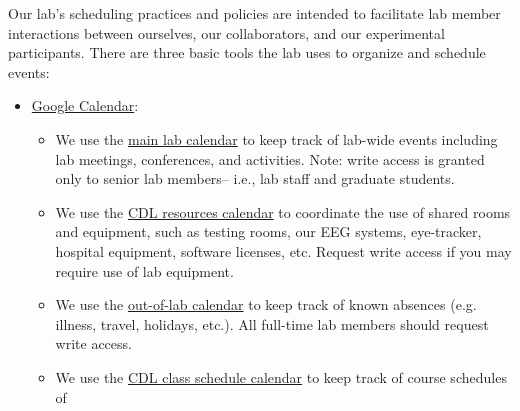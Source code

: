 \documentclass{tufte-book} %
\begin{document}
\label{sec: scheduling}

\noindent{}Our lab's scheduling practices and
policies are intended to facilitate lab member interactions between
ourselves, our collaborators, and our experimental participants.
There are three basic tools the lab uses to organize and schedule
events:
\begin{itemize}
\item \href{http://calendar.google.com}{Google Calendar}:
  \begin{itemize}
  \item We use the
    \href{https://calendar.google.com/calendar/ical/5ta50cfv4uih0a0k8m2di9dhjo\%40group.calendar.google.com/private-ff1338ddce84ac37d5ab682cd94e7f69/basic.ics}{main
      lab calendar} to keep track of lab-wide events including lab
    meetings, conferences, and activities.  Note: write access is
    granted only to senior lab members-- i.e., lab staff and graduate students.
  \item We use the
    \href{https://calendar.google.com/calendar/ical/dgcv8l8a8s10hfg2s5h0qec0q0\%40group.calendar.google.com/private-4810aed94f818d5748045447ab46c62d/basic.ics}{CDL
      resources calendar} to coordinate the use of shared rooms and
    equipment, such as testing rooms, our EEG systems, eye-tracker,
    hospital equipment, software licenses, etc.  Request write access
    if you may require use of lab equipment.
  \item We use the
    \href{https://calendar.google.com/calendar/ical/h1j06dohcg7v1g2o5tkb7ijhvs\%40group.calendar.google.com/private-239aaf8b4dc60480c90e8d7fc353e229/basic.ics}{out-of-lab
      calendar} to keep track of known absences (e.g. illness, travel,
    holidays, etc.).    All
    full-time lab members should request write access.
  \item We use the
    \href{https://calendar.google.com/calendar/ical/v2selomg4o6aobua7g922aamqc\%40group.calendar.google.com/private-4377dd542d0d1f6226c9657955b778c5/basic.ics}{CDL
      class schedule calendar} to keep track of course schedules of

\end{itemize}
\end{itemize}
\end{document}
